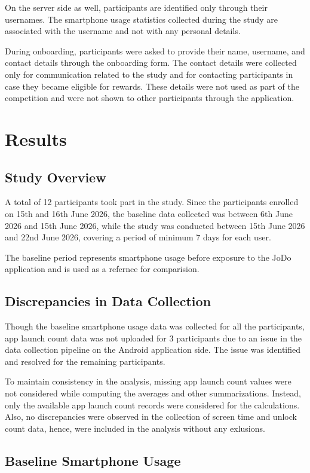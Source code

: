 \documentclass[11pt]{report}
\begin{document}
On the server side as well, participants are identified only through their usernames. 
The smartphone usage statistics collected during the study are associated with the username and not with any personal details.

During onboarding, participants were asked to provide their name, username, and contact details through the onboarding form. 
The contact details were collected only for communication related to the study and for contacting participants in case they became eligible for rewards. 
These details were not used as part of the competition and were not shown to other participants through the application.

\newpage
\chapter{Results}
\section{Study Overview}
A total of 12 participants took part in the study. Since the participants enrolled on 15th and 16th June 2026, 
the baseline data collected was between 6th June 2026 and 15th June 2026, while the study was conducted between 15th June 2026 and 22nd June 2026, 
covering a period of minimum 7 days for each user.

The baseline period represents smartphone usage before exposure to the JoDo application and is used as a refernce
for comparision.

\section{Discrepancies in Data Collection}
Though the baseline smartphone usage data was collected for all the participants, app launch count data was 
not uploaded for 3 participants due to an issue in the data collection pipeline on the Android application 
side. The issue was identified and resolved for the remaining participants. 

To maintain consistency in the analysis, missing app launch count values were not considered while computing the averages 
and other summarizations. Instead, only the available app launch count records were considered for the calculations.
Also, no discrepancies were observed in the collection of screen time and unlock count data, hence, were included in the analysis without any exlusions. 

\section{Baseline Smartphone Usage}
\end{document}
